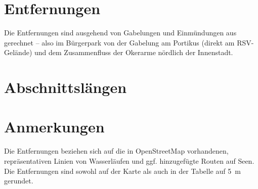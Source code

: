 \documentclass{article}
\begin{document}
    \section*{Entfernungen} Die Entfernungen sind ausgehend von Gabelungen und
    Einmündungen aus gerechnet -- also im Bürgerpark von der Gabelung am
    Portikus (direkt am RSV-Gelände) und dem Zusammenfluss der Okerarme nördlich
    der Innenstadt. \\
    \begin{center}
    \end{center}
    
    \section*{Abschnittslängen}
    
    \begin{center}
    \end{center}    
    
    \section*{Anmerkungen}
    Die Entfernungen beziehen sich auf die in OpenStreetMap vorhandenen,
    repräsentativen Linien von Wasserläufen und ggf. hinzugefügte Routen auf
    Seen. Die Entfernungen sind sowohl auf der Karte als auch in der Tabelle auf 5~m gerundet.    
    
    \begin{minipage}{\textwidth}
        \listoffigures
    \end{minipage}
    
\end{document}
